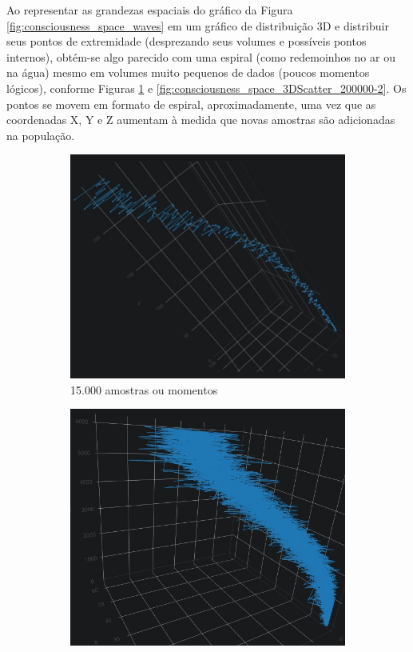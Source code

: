 Ao representar as grandezas espaciais do gráfico da Figura \ref{fig:consciousness_space_waves} em um gráfico de distribuição 3D e distribuir seus pontos de extremidade (desprezando seus volumes e possíveis pontos internos), obtém-se algo parecido com uma espiral (como redemoinhos no ar ou na água) mesmo em volumes muito pequenos de dados (poucos momentos lógicos), conforme Figuras \ref{fig:consciousness_space_3DScatter15000-10} e \ref{fig:consciousness_space_3DScatter_200000-2}. Os pontos se movem em formato de espiral, aproximadamente, uma vez que as coordenadas X, Y e Z aumentam à medida que novas amostras são adicionadas na população.
	\begin{figure}[H]
	\centering
		\begin{subfigure}[H]{0.47\linewidth}
		\centering
		\includegraphics[width=.96\linewidth]{sections/images/consciousness_space_3DScatter15000-10.jpg}
		\caption{15.000 amostras ou momentos}
		\label{fig:consciousness_space_3DScatter15000-10}
		\end{subfigure}
	\hfill
		\begin{subfigure}[H]{0.47\linewidth}
		\centering
		\includegraphics[width=.9\linewidth]{sections/images/consciousness_space_3DScatter_200000-2.jpg}

\end{subfigure}
\end{figure}
